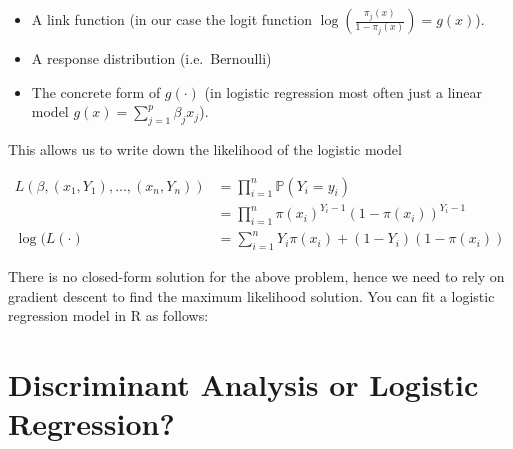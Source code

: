 \documentclass[]{book}
\newenvironment{Shaded}{\begin{snugshade}}{\end{snugshade}}
\newcommand{\KeywordTok}[1]{\textcolor[rgb]{0.13,0.29,0.53}{\textbf{{#1}}}}
\newcommand{\DataTypeTok}[1]{\textcolor[rgb]{0.13,0.29,0.53}{{#1}}}
\newcommand{\FloatTok}[1]{\textcolor[rgb]{0.00,0.00,0.81}{{#1}}}
\newcommand{\StringTok}[1]{\textcolor[rgb]{0.31,0.60,0.02}{{#1}}}
\newcommand{\CommentTok}[1]{\textcolor[rgb]{0.56,0.35,0.01}{\textit{{#1}}}}
\newcommand{\NormalTok}[1]{{#1}}
\providecommand{\tightlist}{%
  \setlength{\itemsep}{0pt}\setlength{\parskip}{0pt}}
\begin{document}
\begin{itemize}
\tightlist
\item
  A link function (in our case the logit function
  \(\log(\frac{\pi_j(x)}{1-\pi_j(x)}) = g(x)\)).
\item
  A response distribution (i.e.~Bernoulli)
\item
  The concrete form of \(g(\cdot)\) (in logistic regression most often
  just a linear model \(g(x) = \sum\limits_{j = 1}^p \beta_j x_j\)).
\end{itemize}

This allows us to write down the likelihood of the logistic model

\begin{equation} 
\begin{split}
L(\beta, (x_1, Y_1), ..., (x_n, Y_n))&  = \prod\limits_{i = 1}^n \mathbb{P}(Y_i = y_i)\\
 & =\prod\limits_{i = 1}^n \pi(x_i)^{Y_i-1}(1-\pi(x_i))^{Y_i-1}\\
\log(L(\cdot) & = \sum\limits_{i = 1}^n Y_i \pi(x_i) + (1 - Y_i) (1 - \pi(x_i))
\end{split}
\label{eq:var-beta}
\end{equation}

There is no closed-form solution for the above problem, hence we need to
rely on gradient descent to find the maximum likelihood solution. You
can fit a logistic regression model in R as follows:

\begin{Shaded}
\end{Shaded}

\section{Discriminant Analysis or Logistic
Regression?}\label{discriminant-analysis-or-logistic-regression}
\end{document}
